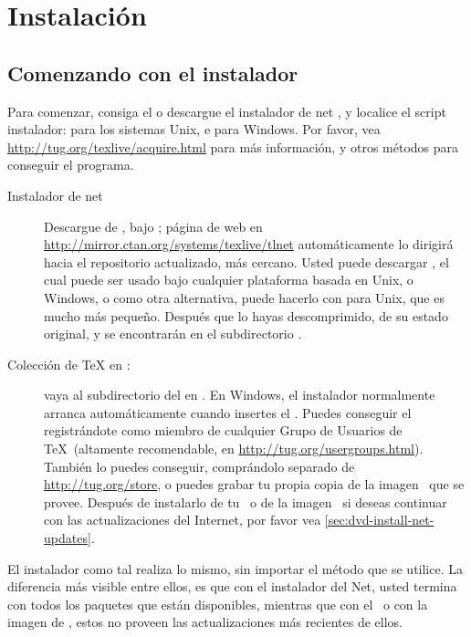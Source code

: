 \documentclass{article}
\begin{document}
\section{Instalación}
\label{sec:install}

\subsection{Comenzando con el instalador}
\label{sec:inst-start}

Para comenzar, consiga el \TK{} \DVD{} o descargue el instalador de
net \TL{}, y localice el script instalador:  para
los sistemas Unix, e  para Windows. Por
favor, vea
\url{http://tug.org/texlive/acquire.html} para más información, y
otros métodos para conseguir el programa.

\begin{description}
	\item [Instalador de net] Descargue de \CTAN{}, bajo
		; página de web en
		\url{http://mirror.ctan.org/systems/texlive/tlnet}
		automáticamente lo dirigirá hacia el repositorio
		actualizado, más cercano. Usted puede  descargar
		, el cual puede ser usado
		bajo cualquier plataforma basada en Unix, o Windows, o
		como otra alternativa, puede hacerlo con
		 para Unix, que es mucho
		más pequeño. Después que lo hayas descomprimido, de
		su estado original,  y
		 se encontrarán en el
		subdirectorio .

\item [Colección de \TeX{} en \DVD:] vaya al subdirectorio del \DVD en
	. En Windows, el instalador normalmente
	arranca automáticamente cuando insertes el \DVD. Puedes
	conseguir el \DVD\, registrándote como miembro de cualquier
	Grupo de Usuarios de \TeX\ (altamente recomendable, en
	\url{http://tug.org/usergroups.html}). También lo puedes
	conseguir, comprándolo separado de \url{http://tug.org/store},
	o puedes grabar tu propia copia de la imagen \ISO\ que se
	provee. Después de instalarlo de tu \DVD\, o de la imagen
	\ISO\, si deseas continuar con las actualizaciones del
	Internet, por favor vea \ref{sec:dvd-install-net-updates}.

\end{description}

El instalador como tal realiza lo mismo, sin importar el método que
se utilice. La diferencia más visible entre ellos, es que con el
instalador del Net, usted termina con todos los paquetes que están
disponibles, mientras que con el \DVD\ o con la imagen de
\ISO, estos no proveen las actualizaciones más recientes de
ellos.
\end{document}
